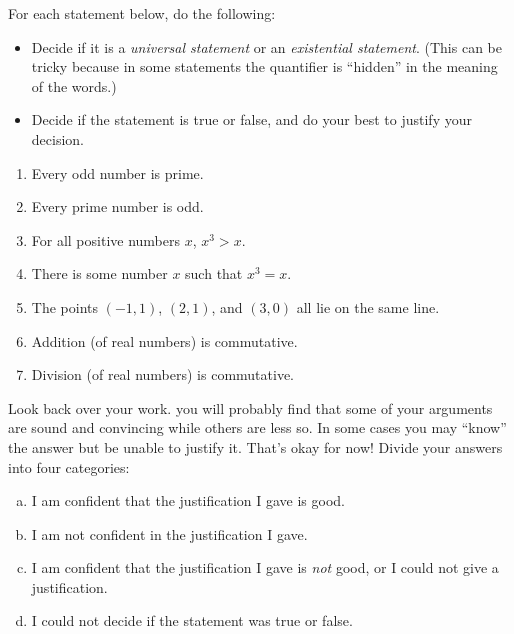 \begin{thinkpair*}
For each statement below, do the following:
\begin{itemize}
\item
Decide if it is a \emph{universal statement} or an \emph{existential statement}.  (This can be tricky because in some statements the quantifier is ``hidden'' in the meaning of the words.)
\item
Decide if the statement is true or false, and do your best to justify your decision.
\end{itemize}

\begin{enumerate}
\item
Every odd number is prime.
\item
Every prime number is odd.
\item
For all positive numbers $x$, $x^3 > x$.
\item
There is some number $x$ such that $x^3 = x$.
\item
The points $(-1,1)$, $(2,1)$, and $(3,0)$ all lie on the same line.
\item
Addition (of real numbers) is commutative.
\item
Division (of real numbers) is commutative.
\end{enumerate}

Look back over your work.  you will probably find that some of your arguments are sound and convincing while others are less so.  In some cases you may ``know'' the answer but be unable to justify it.  That's okay for now!  Divide your answers into four categories:

\bigskip

\begin{enumerate}[(a)]
\item
I am confident that the justification I gave is good.
\item
I am not confident in the justification I gave.
\item
I am confident that the justification I gave is \emph{not} good, or I could not give a justification.
\item
I could not decide if the statement was true or false.
\end{enumerate}


\end{thinkpair*}

